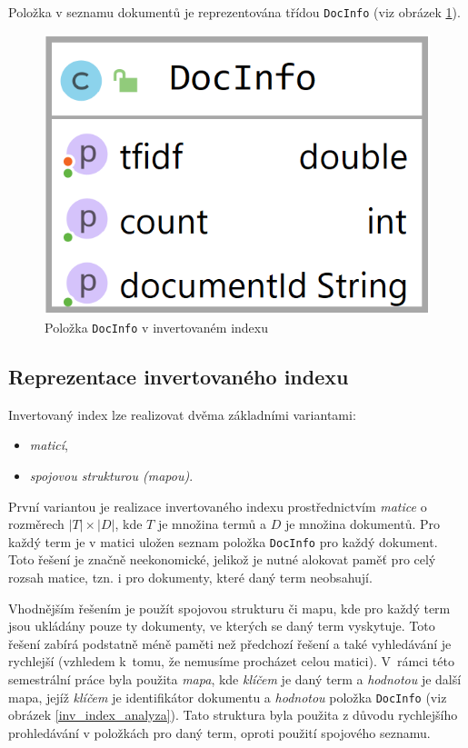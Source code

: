 \documentclass[
11pt,
a4paper,
pdftex,
czech,
titlepage
]{report}
\begin{document}
Položka v seznamu dokumentů je reprezentována třídou \texttt{DocInfo} (viz obrázek \ref{docInfo_analyza}).

\begin{figure}[!ht]
	\centering
	\includegraphics[scale=0.25]{img/DocInfo.png}
	\caption{Položka \texttt{DocInfo} v invertovaném indexu}
	\label{docInfo_analyza}
\end{figure}

\subsection{Reprezentace invertovaného indexu}
Invertovaný index lze realizovat dvěma základními variantami:
\begin{itemize}
    \item \textit{maticí},
    \item \textit{spojovou strukturou (mapou)}.
\end{itemize}

První variantou je realizace invertovaného indexu prostřednictvím \textit{matice} o rozměrech $|T|\times|D|$, kde $T$ je množina termů a $D$ je množina dokumentů. Pro každý term je v matici uložen seznam položka \texttt{DocInfo} pro každý dokument. Toto řešení je značně neekonomické, jelikož je nutné alokovat paměť pro celý rozsah matice, tzn. i pro dokumenty, které daný term neobsahují. 

Vhodnějším řešením je použít spojovou strukturu či mapu, kde pro každý term jsou ukládány pouze ty dokumenty, ve kterých se daný term vyskytuje. Toto řešení zabírá podstatně méně paměti než předchozí řešení a také vyhledávání je rychlejší (vzhledem k~tomu, že nemusíme procházet celou matici). V~rámci této semestrální práce byla použita \textit{mapa}, kde \textit{klíčem} je daný term a \textit{hodnotou} je další mapa, jejíž \textit{klíčem} je identifikátor dokumentu a \textit{hodnotou} položka \texttt{DocInfo} (viz obrázek \ref{inv_index_analyza}). Tato struktura byla použita z důvodu rychlejšího prohledávání v položkách pro daný term, oproti použití spojového seznamu.
\end{document}
